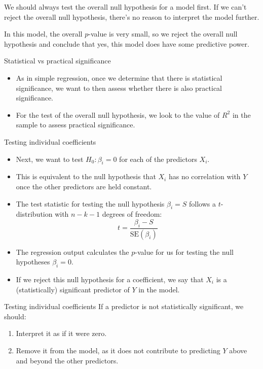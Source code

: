 \documentclass{beamer}\usepackage[]{graphicx}\usepackage[]{color}
\begin{document}
\begin{darkframes}
    \begin{frame}
      We should always test the overall null hypothesis for a model first. \alert{If we can't reject the overall null hypothesis, there's no reason to interpret the model further.}

      \bigskip\pause

      In this model, the overall $p$-value is very small, so we reject the overall null hypothesis and conclude that yes, this model does have some predictive power.
    \end{frame}

    \begin{frame}{Statistical vs practical significance}
      \begin{itemize}
        \item As in simple regression, once we determine that there is statistical significance, we want to then assess whether there is also practical significance.
        \item For the test of the overall null hypothesis, we look to the value of $R^2$ in the sample to assess practical significance.
      \end{itemize}
    \end{frame}

    \begin{frame}{Testing individual coefficients}
      \begin{itemize}[<+->]
        \item Next, we want to test $H_0 : \beta_i=0$ for each of the predictors $X_i$.
        \item This is equivalent to the null hypothesis that $X_i$ has no correlation with $Y$ once the other predictors are held constant.
        \item The test statistic for testing the null hypothesis $\beta_i = S$ follows a $t$-distribution with $n-k-1$ degrees of freedom: \[ t = \frac{\beta_i - S}{\text{SE}(\beta_i)} \]
        \item The regression output calculates the $p$-value for us for testing the null hypotheses $\beta_i = 0$.
        \item If we reject this null hypothesis for a coefficient, we say that $X_i$  is a (statistically) significant predictor of $Y$ in the model.
      \end{itemize}
    \end{frame}

    \begin{frame}{Testing individual coefficients}
      If a predictor is not statistically significant, we should:
      \begin{enumerate}[<+->]
        \item Interpret it as if it were zero.
        \item Remove it from the model, as it does not contribute to predicting $Y$ above and beyond the other predictors.
      \end{enumerate}
    \end{frame}


\end{darkframes}
\end{document}
